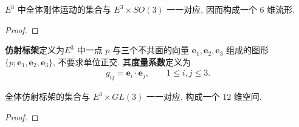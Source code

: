 \documentclass[../../main.tex]{subfiles}%
\begin{document}
\begin{proposition}
$E^3$ 中全体刚体运动的集合与 $E^3\times SO(3)$ 一一对应, 因而构成一个 $6$ 维流形.
\end{proposition}
\begin{proof}

\end{proof}

\begin{definition}[仿射标架]
\textbf{仿射标架}定义为$E^3$ 中一点 $p$ 与三个不共面的向量 $\bm e_1,\bm e_2,\bm e_3$ 组成的图形 $\{p;\bm e_1,\bm e_2,\bm e_3\}$, 不要求单位正交. 其\textbf{度量系数}定义为
\begin{align*}
g_{ij} = \bm e_i\cdot\bm e_j,\qquad 1\leqslant i,j\leqslant 3.
\end{align*}
\end{definition}

\begin{proposition}
全体仿射标架的集合与 $E^3\times GL(3)$ 一一对应, 构成一个 $12$ 维空间.
\end{proposition}
\begin{proof}

\end{proof}
\end{document}

